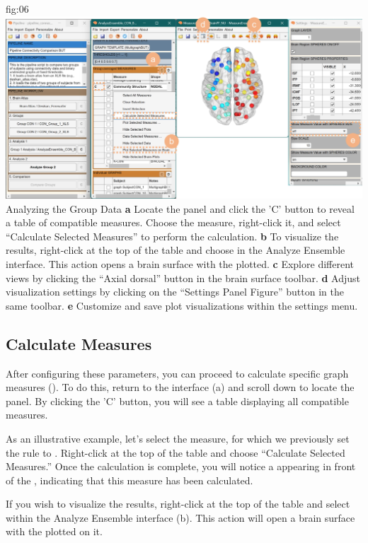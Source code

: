 \documentclass[justified]{tufte-handout}
\begin{document}
	{fig:06}
	{
	\includegraphics{fig06.jpg}
	}
	{Analyzing the Group Data}
	{
	{\bf a} Locate the  panel and click the 'C' button to 		reveal a table of compatible measures. Choose the  measure, right-click it, and select “Calculate Selected Measures” to perform the calculation.
	{\bf b} To visualize the results, right-click at the top of the table and choose  in the Analyze Ensemble interface. This action opens a brain surface with the  plotted.
	{\bf c} Explore different views by clicking the “Axial dorsal” button in the brain surface toolbar.
	{\bf d} Adjust visualization settings by clicking on the “Settings Panel Figure” button in the same toolbar.
	{\bf e} Customize and save plot visualizations within the settings menu.
	}
 
\subsection{Calculate Measures}
 
After configuring these parameters, you can proceed to calculate specific graph measures (). To do this, return to the  interface (a) and scroll down to locate the  panel. By clicking the 'C' button, you will see a table displaying all compatible measures.

As an illustrative example, let's select the  measure, for which we previously set the rule to . Right-click at the top of the table and choose “Calculate Selected Measures.” Once the calculation is complete, you will notice a  appearing in front of the , indicating that this measure has been calculated.

If you wish to visualize the results, right-click at the top of the table and select  within the Analyze Ensemble interface (b). This action will open a brain surface with the  plotted on it.
\end{document}
